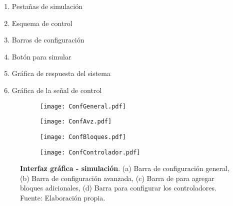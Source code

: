     \begin{multicols}{2}
        \begin{enumerate}[leftmargin=20pt]
            \item Pestañas de simulación
            \item Esquema de control
            \item Barras de configuración
            \item Botón para simular
            \item Gráfica de respuesta del sistema
            \item Gráfica de la señal de control
        \end{enumerate}
    \end{multicols}

    \begin{figure}[h]
        \centering
        \begin{subfigure}[b]{0.49\textwidth}
            \centering
            \texttt{[image: ConfGeneral.pdf]}
            \caption{}
            \label{fig:ConfGeneral}
        \end{subfigure}
        \hfill
        \begin{subfigure}[b]{0.49\textwidth}
            \centering
            \texttt{[image: ConfAvz.pdf]}
            \caption{}
            \label{fig:ConfAvz}
        \end{subfigure}
        \hfill
        \begin{subfigure}[b]{0.49\textwidth}
            \centering
            \texttt{[image: ConfBloques.pdf]}
            \caption{}
            \label{fig:ConfBloques}
        \end{subfigure}
        \hfill
        \begin{subfigure}[b]{0.49\textwidth}
            \centering
            \texttt{[image: ConfControlador.pdf]}
            \caption{}
            \label{fig:ConfControlador}
        \end{subfigure}
        \caption[Interfaz gráfica - simulación - Barras de configuración]{\textbf{Interfaz gráfica - simulación}. (a) Barra de configuración general, (b) Barra de configuración avanzada, (c) Barra de para agregar bloques adicionales, (d) Barra para configurar los controladores. Fuente: Elaboración propia. \label{fig:SimulacionBarras}}
    \end{figure}

